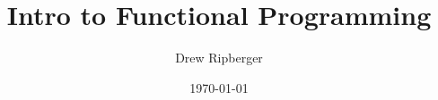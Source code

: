 \documentclass{beamer}
\title{Intro to Functional Programming}
\author{Drew Ripberger}
\date{\today}
\begin{document}
\frame{\titlepage}
\end{document}
